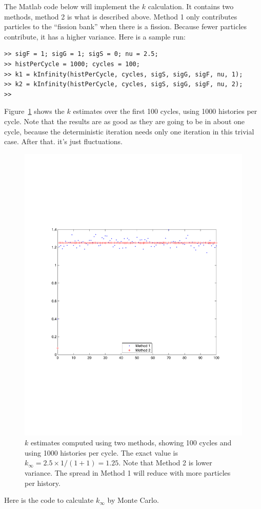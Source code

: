 \documentclass[12pt]{article}
\begin{document}
The Matlab code below will implement the $k$ calculation.  It contains two methods, method 2 is what is described above.  Method 1 only contributes particles to the ``fission bank'' when there is a fission.  Because fewer particles contribute, it has a higher variance.  Here is a sample run:
\begin{Verbatim}
>> sigF = 1; sigG = 1; sigS = 0; nu = 2.5;
>> histPerCycle = 1000; cycles = 100;
>> k1 = kInfinity(histPerCycle, cycles, sigS, sigG, sigF, nu, 1);
>> k2 = kInfinity(histPerCycle, cycles, sigS, sigG, sigF, nu, 2);
>> 
\end{Verbatim}

Figure~\ref{fig:k1000} shows the $k$ estimates over the first 100 cycles, using 1000 histories per cycle.  Note that the results are as good as they are going to be in about one cycle, because the deterministic iteration needs only one iteration in this trivial case.  After that. it's just fluctuations.

\begin{figure}
\begin{center}
\includegraphics{k1000.pdf}
\end{center}
\caption{$k$ estimates computed using two methods, showing 100 cycles and using 1000 histories per cycle. The exact value is $k_\infty = 2.5 \times 1 / (1 + 1) = 1.25$.  Note that Method 2 is lower variance.  The spread in Method 1 will reduce with more particles per history.}
\label{fig:k1000}
\end{figure}

Here is the code to calculate $k_\infty$ by Monte Carlo.

{\small
{}
}
\end{document}
